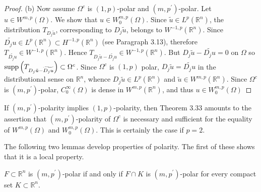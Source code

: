 \begin{proof}
  (b) Now assume $\Omega^c$ is $(1, p)$-polar and $\left(m, p^{\prime}\right)$-polar. Let $u \in W^{m, p}(\Omega)$. We show that $u \in W_0^{m, p}(\Omega)$. Since $\tilde{u} \in L^p\left(\mathbb{R}^n\right)$, the distribution $T_{D_j \tilde{u}}$, corresponding to $D_j \tilde{u}$, belongs to $W^{-1, p}\left(\mathbb{R}^n\right)$. Since $\widetilde{D_j u} \in L^p\left(\mathbb{R}^n\right) \subset H^{-1, p}\left(\mathbb{R}^n\right)$ (see Paragraph 3.13), therefore $T_{\widetilde{D_j u}} \in W^{-1, p}\left(\mathbb{R}^n\right)$. Hence $T_{D_j \tilde{u}-\widetilde{D_j u}} \in W^{-1, p}\left(\mathbb{R}^n\right)$. But $D_j \tilde{u}-\widetilde{D_j u}=0$ on $\Omega$ so $\operatorname{supp}\left(T_{D_j \tilde{u}-\widetilde{D_j u}}\right) \subset \Omega^c$. Since $\Omega^c$ is $(1, p)$ polar, $D_j \tilde{u}=\widetilde{D_j u}$ in the distributional sense on $\mathbb{R}^n$, whence $D_j \tilde{u} \in L^p\left(\mathbb{R}^n\right)$ and $\tilde{u} \in W^{m, p}\left(\mathbb{R}^n\right)$. Since $\Omega^c$ is $\left(m, p^{\prime}\right)$-polar, $C_0^{\infty}(\Omega)$ is dense in $W^{m,p}\left(\mathbb{R}^n\right)$, and thus $u \in W_0^{m, p}(\Omega)$
\end{proof}

\begin{para}
  If $\left(m, p^{\prime}\right)$-polarity implies $(1, p)$-polarity, then Theorem 3.33 amounts to the assertion that $\left(m, p^{\prime}\right)$-polarity of $\Omega^c$ is necessary and sufficient for the equality of $W^{m,p}(\Omega)$ and $W_0^{m, p}(\Omega)$. This is certainly the case if $p=2$.
\end{para}

The following two lemmas develop properties of polarity. The first of these shows that it is a local property.


\begin{lemma}
  $F \subset \mathbb{R}^n$ is $\left(m, p^{\prime}\right)$-polar if and only if $F \cap K$ is $\left(m, p^{\prime}\right)$-polar for every compact set $K \subset \mathbb{R}^n$.
\end{lemma}

